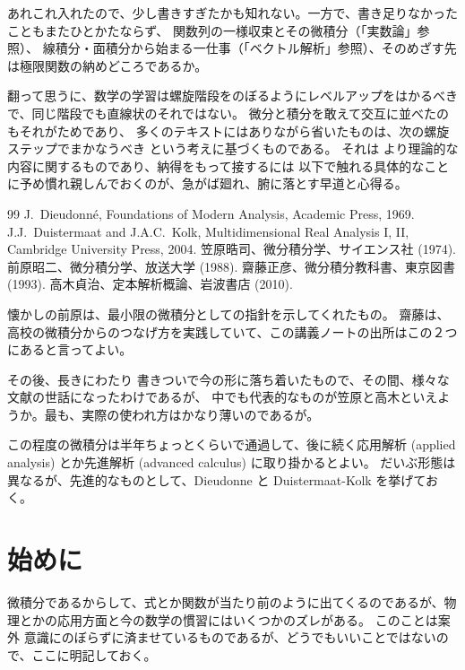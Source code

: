 \documentclass[a4paper]{jsarticle}
\theoremstyle{definition}
\theoremstyle{remark}
\begin{document}
あれこれ入れたので、少し書きすぎたかも知れない。一方で、書き足りなかったこともまたひとかたならず、
関数列の一様収束とその微積分（「実数論」参照）、
線積分・面積分から始まる一仕事（「ベクトル解析」参照）、そのめざす先は極限関数の納めどころであるか。

翻って思うに、数学の学習は螺旋階段をのぼるようにレベルアップをはかるべきで、同じ階段でも直線状のそれではない。
微分と積分を敢えて交互に並べたのもそれがためであり、
多くのテキストにはありながら省いたものは、次の螺旋ステップでまかなうべき という考えに基づくものである。
それは より理論的な内容に関するものであり、納得をもって接するには 以下で触れる具体的なことに予め慣れ親しんでおくのが、急がば廻れ、腑に落とす早道と心得る。




\bigskip
\begin{thebibliography}{99}
  J.~Dieudonn\'e, Foundations of Modern Analysis, Academic Press, 1969.
 J.J.~Duistermaat and J.A.C.~Kolk, Multidimensional Real Analysis I, II,  Cambridge University Press, 2004. 
  笠原晧司、微分積分学、サイエンス社 (1974). 
  前原昭二、微分積分学、放送大学 (1988). 
  齋藤正彦、微分積分教科書、東京図書 (1993).
  高木貞治、定本解析概論、岩波書店 (2010). 
\end{thebibliography}

懐かしの前原は、最小限の微積分としての指針を示してくれたもの。
齋藤は、高校の微積分からのつなげ方を実践していて、この講義ノートの出所はこの２つにあると言ってよい。

その後、長きにわたり 書きついで今の形に落ち着いたもので、その間、様々な文献の世話になったわけであるが、
中でも代表的なものが笠原と高木といえようか。最も、実際の使われ方はかなり薄いのであるが。

この程度の微積分は半年ちょっとくらいで通過して、後に続く応用解析 (applied analysis) とか先進解析 (advanced calculus) に取り掛かるとよい。
だいぶ形態は異なるが、先進的なものとして、Dieudonne と Duistermaat-Kolk を挙げておく。

\section*{始めに}
微積分であるからして、式とか関数が当たり前のように出てくるのであるが、物理とかの応用方面と今の数学の慣習にはいくつかのズレがある。
このことは案外 意識にのぼらずに済ませているものであるが、どうでもいいことではないので、ここに明記しておく。
\end{document}
